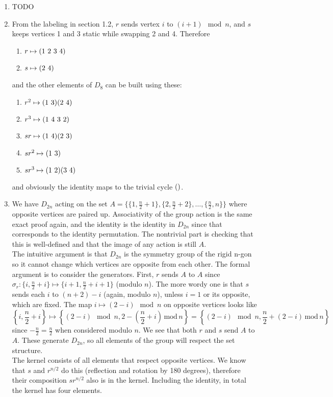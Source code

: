 \documentclass[]{article}
\newcommand{\md}{\,\text{mod}\,}
\newcommand*{\cycle}[1]{( \foreach \entry [count=\i] in {#1} {\ifnum\i>1\ \fi\entry})}
\begin{document}
\begin{enumerate}
\item {\color{red} TODO}


\item From the labeling in section 1.2, $r$ sends vertex $i$ to $(i+1)\!\mod n$, and $s$ keeps vertices 1 and 3 static while swapping 2 and 4. Therefore
\begin{enumerate}
\item $r \mapsto \cycle{1,2,3,4}$
\item $s \mapsto \cycle{2,4}$
\end{enumerate}
and the other elements of $D_8$ can be built using these:
\begin{enumerate}
\item $r^2 \mapsto \cycle{1,3}\cycle{2,4}$
\item $r^3 \mapsto \cycle{1,4,3,2}$
\item $sr \mapsto \cycle{1,4}\cycle{2,3}$
\item $sr^2 \mapsto \cycle{1,3}$
\item $sr^3 \mapsto \cycle{1,2}\cycle{3,4}$
\end{enumerate}
and obviously the identity maps to the trivial cycle $\cycle{}$.


\item We have $D_{2n}$ acting on the set $A = \{ \{1,\frac{n}{2}+1\}, \{2,\frac{n}{2}+2\}, \ldots, \{\frac{n}{2},n\} \}$ where opposite vertices are paired up. Associativity of the group action is the same exact proof again, and the identity is the identity in $D_{2n}$ since that corresponds to the identity permutation. The nontrivial part is checking that this is well-defined and that the image of any action is still $A$. \\
The intuitive argument is that $D_{2n}$ is the symmetry group of the rigid n-gon so it cannot change which vertices are opposite from each other. The formal argument is to consider the generators. First, $r$ sends $A$ to $A$ since $\sigma_r: \{i,\frac{n}{2}+i\} \mapsto \{i+1,\frac{n}{2}+i+1\}$ (modulo $n$). The more wordy one is that $s$ sends each $i$ to $(n+2)-i$ (again, modulo $n$), unless $i=1$ or its opposite, which are fixed. The map $i \mapsto (2-i)\!\!\!\mod n$ on opposite vertices looks like
\begin{equation}
\left\{i,\frac{n}{2}+i\right\} \mapsto \left\{(2-i)\!\!\!\!\mod n,2-\left(\frac{n}{2}+i\right)\md n\right\} = \left\{(2-i)\!\!\!\!\mod n,\frac{n}{2} + \left( 2-i \right)\!\md n\right\}
\end{equation}
since $-\frac{n}{2} = \frac{n}{2}$ when considered modulo $n$. We see that both $r$ and $s$ send $A$ to $A$. These generate $D_{2n}$, so all elements of the group will respect the set structure. \\
The kernel consists of all elements that respect opposite vertices. We know that $s$ and $r^{n/2}$ do this (reflection and rotation by 180 degrees), therefore their composition $sr^{n/2}$ also is in the kernel. Including the identity, in total the kernel has four elements.



\end{enumerate}
\end{document}
